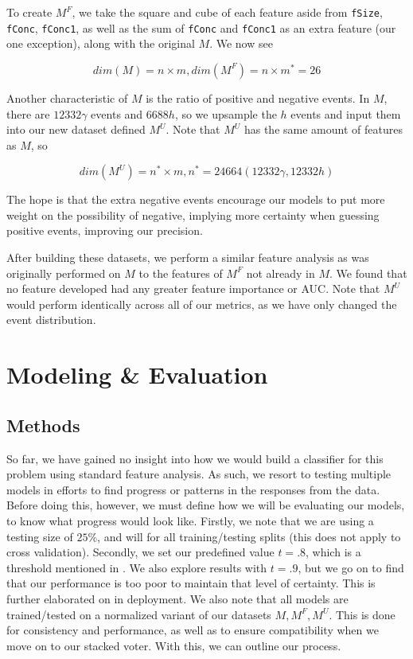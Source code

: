 \documentclass[12pt, a4paper]{article} %
\begin{document}
To create $M^{F}$, we take the square and cube of each feature aside from {\tt fSize}, {\tt fConc}, {\tt fConc1}, as well as the sum of {\tt fConc} and {\tt fConc1} as an extra feature (our one exception), along with the original $M$. We now see

$$dim \left( M \right) = n \times m, dim \left( M^{F} \right) = n \times m^* = 26$$

Another characteristic of $M$ is the ratio of positive and negative events. In $M$, there are $12332 \gamma$ events and $6688 h$, so we upsample the $h$ events and input them into our new dataset defined $M^{U}$. Note that $M^{U}$ has the same amount of features as $M$, so

$$dim \left( M^{U} \right) = n^* \times m , n^* = 24664 \left(12332 \gamma, 12332 h\right)$$

The hope is that the extra negative events encourage our models to put more weight on the possibility of negative, implying more certainty when guessing positive events, improving our precision. 

After building these datasets, we perform a similar feature analysis as was originally performed on $M$ to the features of $M^{F}$ not already in $M$. We found that no feature developed had any greater feature importance or AUC.  Note that $M^{U}$ would perform identically across all of our metrics, as we have only changed the event distribution. 

\section{Modeling \& Evaluation}

\subsection{Methods}

So far, we have gained no insight into how we would build a classifier for this problem using standard feature analysis. As such, we resort to testing multiple models in efforts to find progress or patterns in the responses from the data. Before doing this, however, we must define how we will be evaluating our models, to know what progress would look like. Firstly, we note that we are using a testing size of $25\%$, and will for all training/testing splits (this does not apply to cross validation). Secondly, we set our predefined value $t=.8$, which is a threshold mentioned in \cite{CaseStudy}. We also explore results with $t=.9$, but we go on to find that our performance is too poor to maintain that level of certainty. This is further elaborated on in deployment. We also note that all models are trained/tested on a normalized variant of our datasets $M, M^{F}, M^{U}$. This is done for consistency and performance, as well as to ensure compatibility when we move on to our stacked voter. With this, we can outline our process. 
\end{document}
